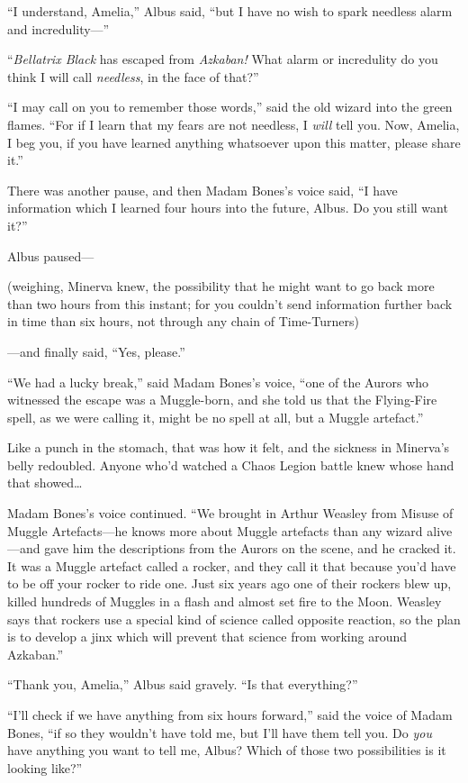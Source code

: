 “I understand, Amelia,” Albus said, “but I have no wish to spark needless alarm and incredulity—”

“\emph{Bellatrix Black} has escaped from \emph{Azkaban!} What alarm or incredulity do you think I will call \emph{needless}, in the face of that?”

“I may call on you to remember those words,” said the old wizard into the green flames. “For if I learn that my fears are not needless, I \emph{will} tell you. Now, Amelia, I beg you, if you have learned anything whatsoever upon this matter, please share it.”

There was another pause, and then Madam Bones’s voice said, “I have information which I learned four hours into the future, Albus. Do you still want it?”

Albus paused—

(weighing, Minerva knew, the possibility that he might want to go back more than two hours from this instant; for you couldn’t send information further back in time than six hours, not through any chain of Time-Turners)

—and finally said, “Yes, please.”

“We had a lucky break,” said Madam Bones’s voice, “one of the Aurors who witnessed the escape was a Muggle-born, and she told us that the Flying-Fire spell, as we were calling it, might be no spell at all, but a Muggle artefact.”

Like a punch in the stomach, that was how it felt, and the sickness in Minerva’s belly redoubled. Anyone who’d watched a Chaos Legion battle knew whose hand that showed…

Madam Bones’s voice continued. “We brought in Arthur Weasley from Misuse of Muggle Artefacts—he knows more about Muggle artefacts than any wizard alive—and gave him the descriptions from the Aurors on the scene, and he cracked it. It was a Muggle artefact called a rocker, and they call it that because you’d have to be off your rocker to ride one. Just six years ago one of their rockers blew up, killed hundreds of Muggles in a flash and almost set fire to the Moon. Weasley says that rockers use a special kind of science called opposite reaction, so the plan is to develop a jinx which will prevent that science from working around Azkaban.”

“Thank you, Amelia,” Albus said gravely. “Is that everything?”

“I’ll check if we have anything from six hours forward,” said the voice of Madam Bones, “if so they wouldn’t have told me, but I’ll have them tell you. Do \emph{you} have anything you want to tell me, Albus? Which of those two possibilities is it looking like?”

